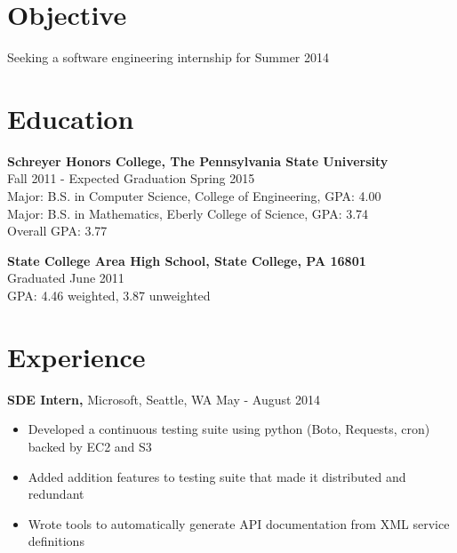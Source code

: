 \documentclass[margin]{res}
\begin{document}
 
\address{{\bf Present Address} \\ 428 West Nittany Avenue \\ Apartment 3 \\ State College, PA 16801 \\
        (814) 574-8768 }
\address{{\bf Permanent Address} \\ 3144 Williamsburg Court \\ State College, PA 16801 \\ (814) 574-0111 \\ douglasjordan0@gmail.com } 
\begin{resume} 
 
\section{Objective} 
Seeking a software engineering internship for Summer 2014

\section{Education} 
{\bf Schreyer Honors College, The Pennsylvania State University} \\
Fall 2011 - Expected Graduation Spring 2015 \\
Major: B.S. in Computer Science, College of Engineering, GPA: 4.00 \\
Major: B.S. in Mathematics, Eberly College of Science, GPA: 3.74 \\
Overall GPA: 3.77

{\bf State College Area High School, State College, PA 16801} \\
Graduated June 2011 \\
GPA: 4.46 weighted, 3.87 unweighted

\section{Experience}

{\bf SDE Intern,} Microsoft, Seattle, WA \hfill May - August 2014
\begin{itemize} \itemsep -2pt  %
\item Developed a continuous testing suite using python (Boto, Requests, cron) backed by EC2 and S3
\item Added addition features to testing suite that made it distributed and redundant 
\item Wrote tools to automatically generate API documentation from XML service definitions
\end{itemize}


\end{resume}
\end{document}
